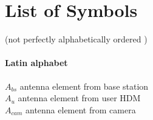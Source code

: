 














\newcommand\mytab{\tab \hspace{-5cm}}




\chapter*{List of Symbols} 
(not perfectly alphabetically ordered )

\subsubsection*{Latin alphabet}

$A_{bs}$ \mytab antenna element from base station \\
$A_{u}$ \mytab antenna element from user \acs{HDM} \\
$A_{cam}$ \mytab antenna element from camera \\


